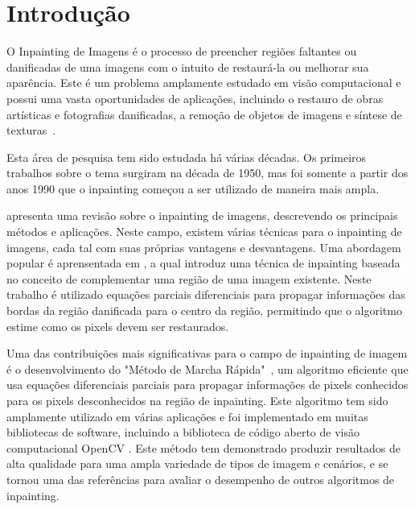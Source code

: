 
\section{Introdução}
O Inpainting de Imagens é o processo de preencher regiões faltantes ou danificadas de uma imagens com o intuito de restaurá-la ou melhorar sua aparência. Este é um problema amplamente estudado em visão computacional e possui uma vasta oportunidades de aplicações, incluindo o restauro de obras artísticas e fotografias danificadas, a remoção de objetos de imagens e síntese de texturas~\cite{criminisi2004region}.

Esta área de pesquisa tem sido estudada há várias décadas. Os primeiros trabalhos sobre o tema surgiram na década de 1950, mas foi somente a partir dos anos 1990 que o inpainting começou a ser utilizado de maneira mais ampla.

\cite{Elharrouss2019} apresenta uma revisão sobre o inpainting de imagens, descrevendo os principais métodos e aplicações. Neste campo, existem várias técnicas para o inpainting de imagens, cada tal com suas próprias vantagens e desvantagens. Uma abordagem popular é aprensentada em \cite{Bertalmio2000}, a qual introduz uma técnica de inpainting baseada no conceito de complementar uma região de uma imagem existente. Neste trabalho é utilizado equações parciais diferenciais para propagar informações das bordas da região danificada para o centro da região, permitindo que o algoritmo estime como os pixels devem ser restaurados.

Uma das contribuições mais significativas para o campo de inpainting de imagem é o desenvolvimento do "Método de Marcha Rápida"~\cite{Telea2004}, um algoritmo eficiente que usa equações diferenciais parciais para propagar informações de pixels conhecidos para os pixels desconhecidos na região de inpainting. Este algoritmo tem sido amplamente utilizado em várias aplicações e foi implementado em muitas bibliotecas de software, incluindo a biblioteca de código aberto de visão computacional OpenCV \cite{OpenCV}. Este método tem demonstrado produzir resultados de alta qualidade para uma ampla variedade de tipos de imagem e cenários, e se tornou uma das referências para avaliar o desempenho de outros algoritmos de inpainting.

